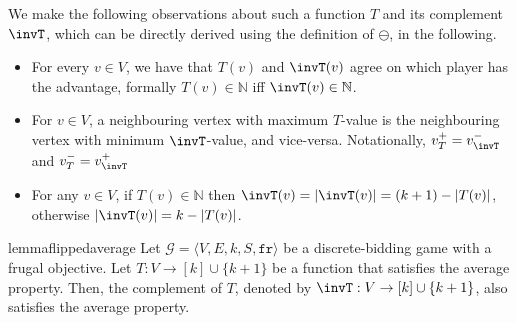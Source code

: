 \documentclass{theoretics}
\newcommand{\G}{{\mathcal G}}
\newcommand{\fr}{\texttt{fr}}
\newcommand{\Nat}{\mathbb{N}}
\newcommand{\zug}[1]{\langle #1  \rangle}
\begin{document}
\begin{observation}\label{obs: property}
	We make the following observations about such a function \(T\) and its complement \(\invT\), which can be directly derived using the definition of \(\ominus\), in the following.
	
	\begin{itemize}
		\item[\textbf{I.} ]
		For every $v \in V$, we have that $T(v)$ and $\invT(v)$ agree on which player has the advantage, formally \(T(v) \in \Nat\) iff \(\invT(v) \in \Nat\).  
		
		\item[\textbf{II.}] For $v \in V$, a neighbouring vertex with maximum \(T\)-value is the neighbouring vertex with minimum \(\invT\)-value, and vice-versa. 
		Notationally, \(v^+_T = v^-_{\invT}\) and \(v^-_T = v^+_{\invT}\)
		
		\item[\textbf{III}] For any \(v \in V\), if \(T(v) \in \Nat\) then \(\invT(v) = |\invT(v)| = (k+1) - |T(v)|\), otherwise \(|\invT(v)| = k - |T(v)|\). 		
	\end{itemize}
\end{observation}
 




\begin{restatable}{lemma}{flippedaverage}
	\label{lem:flippedaverage}
	Let $\G = \zug{V, E, k, S, \fr}$ be a discrete-bidding game with a frugal objective. Let \(T: V \rightarrow [k] \cup \{k+1\}\) be a function that satisfies the average property. 
	Then, the complement of \(T\), denoted by \(\invT: V \rightarrow [k] \cup \{k+1\}\),  also satisfies the average property. 

\end{restatable}
\end{document}
